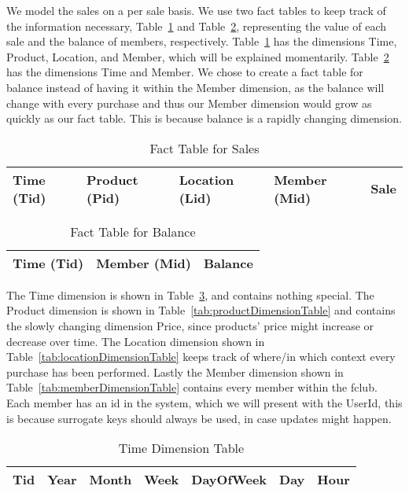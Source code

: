 We model the sales on a per sale basis. We use two fact tables to keep track of the information necessary, Table~\ref{tab:salesFactTable} and Table~\ref{tab:balanceFactTable}, representing the value of each sale and the balance of members, respectively. Table~\ref{tab:salesFactTable} has the dimensions Time, Product, Location, and Member, which will be explained momentarily. Table~\ref{tab:balanceFactTable} has the dimensions Time and Member. We chose to create a fact table for balance instead of having it within the Member dimension, as the balance will change with every purchase and thus our Member dimension would grow as quickly as our fact table. This is because balance is a rapidly changing dimension.


\begin{table}[H]
    \centering
    \begin{tabular}{|l|l|l|l|l|}
        \hline
        Time (Tid) & Product (Pid) & Location (Lid) & Member (Mid) & Sale \\ \hline
    \end{tabular}
    \caption{Fact Table for Sales}
    \label{tab:salesFactTable}
\end{table}

\begin{table}[H]
    \centering
    \begin{tabular}{|l|l|l|}
        \hline
        Time (Tid) & Member (Mid) & Balance \\ \hline
    \end{tabular}
    \caption{Fact Table for Balance}
    \label{tab:balanceFactTable}
\end{table}

The Time dimension is shown in Table~\ref{tab:timeDimensionTable}, and contains nothing special. The Product dimension is shown in Table~\ref{tab:productDimensionTable} and contains the slowly changing dimension Price, since products' price might increase or decrease over time. The Location dimension shown in Table~\ref{tab:locationDimensionTable} keeps track of where/in which context every purchase has been performed. Lastly the Member dimension shown in Table~\ref{tab:memberDimensionTable} contains every member within the fclub. Each member has an id in the system, which we will present with the UserId, this is because surrogate keys should always be used, in case updates might happen.

\begin{table}[H]
    \centering
    \begin{tabular}{|l|l|l|l|l|l|l|}
        \hline
        Tid & Year & Month & Week & DayOfWeek & Day & Hour \\ \hline
    \end{tabular}
    \caption{Time Dimension Table}
    \label{tab:timeDimensionTable}
\end{table}

